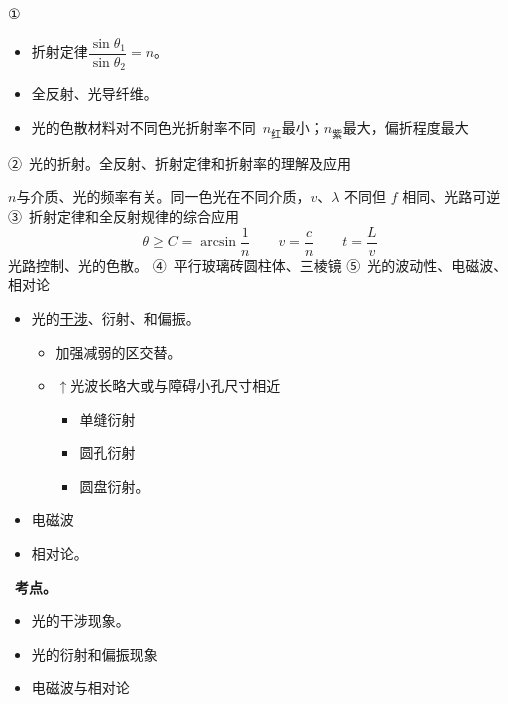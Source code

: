 ①
\begin{itemize}
\item 折射定律\quad $\dfrac{\sin\theta_1}{\sin\theta_2}=n$。
\item 全反射、光导纤维。
\item 光的色散\quad 材料对不同色光折射率不同\ $n_{\text{红}}$最小；$n_{\text{紫}}$最大，偏折程度最大
\end{itemize}
②\ 光的折射。全反射、折射定律和折射率的理解及应用

$n$与介质、光的频率有关。同一色光在不同介质，$v$、$\lambda$ 不同但 $f$ 相同、光路可逆
③\ 折射定律和全反射规律的综合应用
\[ \theta\ge C=\arcsin\frac{1}{n}\qquad v=\frac{c}{n}\qquad t=\frac{L}{v} \]
光路控制、光的色散。
④\ 平行玻璃砖\quad 圆柱体、三棱镜
⑤\ 光的波动性、电磁波、相对论
\begin{itemize}
\item 光的\uline{干涉}、衍射、和偏振。
  \begin{itemize}
  \item 加强减弱的区交替。
  \item $\uparrow$光波长略大或与障碍小孔尺寸相近
    \begin{itemize}
    \item 单缝衍射
    \item 圆孔衍射
    \item 圆盘衍射。
    \end{itemize}
  \end{itemize}
\item 电磁波
\item 相对论。
\end{itemize}
\ \textbf{考点。}
\begin{itemize}
\item 光的干涉现象。
\item 光的衍射和偏振现象
\item 电磁波与相对论
\end{itemize}
